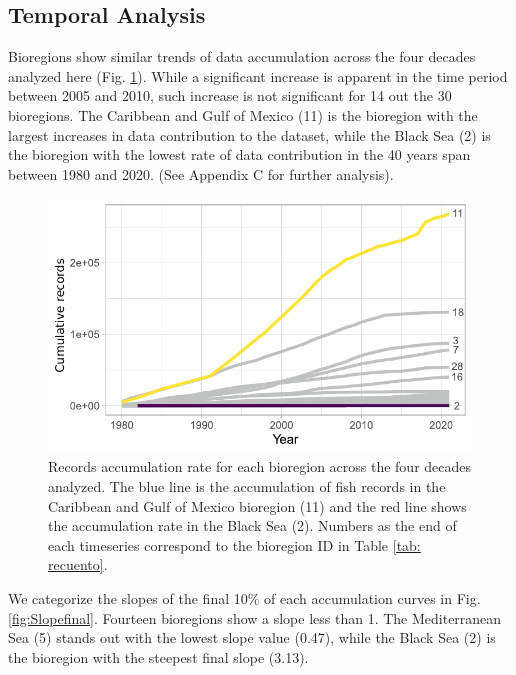 \documentclass[12pt,authoryear]{elsarticle}
\providecommand{\DIFaddbeginFL}{} %
\providecommand{\DIFaddendFL}{} %
\providecommand{\DIFdelbeginFL}{} %
\providecommand{\DIFdelendFL}{} %
\begin{document}
\subsection{Temporal Analysis}
\label{sec:temporal-analysis}
Bioregions show similar trends of data accumulation across the four decades analyzed here (Fig. \ref{fig:record-accumlation}). While a significant increase is apparent in the time period between 2005 and 2010, such increase is not significant for 14 out the 30 bioregions. The Caribbean and Gulf of Mexico (11) is the bioregion with the largest increases in data contribution to the dataset, while the Black Sea (2) is the bioregion with the lowest rate of data contribution in the 40 years span between 1980 and 2020. (See  Appendix C for further analysis).

\begin{figure}[h]
  \centering
  \DIFdelbeginFL %
\DIFdelendFL \DIFaddbeginFL \includegraphics[width=.8\textwidth]{Fig_3}
  \DIFaddendFL \caption{Records accumulation rate for each bioregion across the four decades analyzed. The blue line is the  accumulation of fish records  in the Caribbean and Gulf of Mexico bioregion (11) and the red line shows the accumulation rate in the Black Sea (2). Numbers as the end of each timeseries correspond to the bioregion ID in Table \ref{tab: recuento}.}
  \label{fig:record-accumlation}
\end{figure}

We categorize the slopes of the final 10\% of each accumulation curves  in Fig. \ref{fig:Slopefinal}. Fourteen bioregions show a slope less than 1. The Mediterranean Sea (5) stands out with the lowest slope value (0.47), while the Black Sea (2) is the bioregion with the steepest final slope (3.13). 
\end{document}
